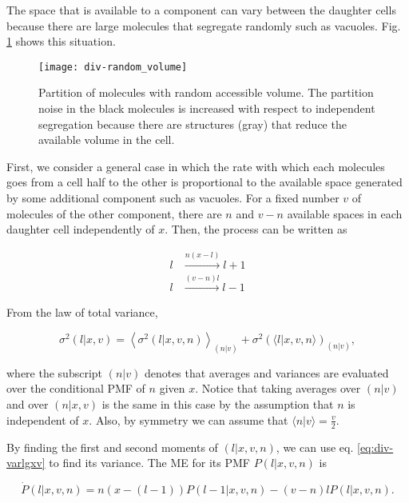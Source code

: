 The space that is available to a component can vary between the daughter cells because there are large molecules that segregate randomly such as vacuoles. Fig. \ref{fig:div-random_volume} shows this situation.

\begin{figure}[H]
  \centering
  \texttt{[image: div-random\_volume]}
  \caption[Partition of molecules with random accessible volume]{\label{fig:div-random_volume}Partition of molecules with random accessible volume. The partition noise in the black molecules is increased with respect to independent segregation because there are structures (gray) that reduce the available volume in the cell.}
\end{figure}

First, we consider a general case in which the rate with which each molecules goes from a cell half to the other is proportional to the available space generated by some additional component such as vacuoles. For a fixed number $v$ of molecules of the other component, there are $n$ and $v-n$ available spaces in each daughter cell independently of $x$. Then, the process can be written as

\begin{equation}
  \label{eq:div-arr_disg}
  \begin{split}
    l&\xrightarrow{n(x-l)}l+1\\
    l&\xrightarrow{(v-n)l}l-1
  \end{split}
\end{equation}

From the law of total variance,

\begin{equation}
  \label{eq:div-varlgxv}
  \sigma^2(l|x,v) = \left\langle\sigma^2(l|x,v,n)\right\rangle_{(n|v)}+\sigma^2\left(\langle l|x,v,n\rangle\right)_{(n|v)},
\end{equation}

where the subscript $(n|v)$ denotes that averages and variances are evaluated over the conditional PMF of $n$ given $x$. Notice that taking averages over $(n|v)$ and over $(n|x,v)$ is the same in this case by the assumption that $n$ is independent of $x$. Also, by symmetry we can assume that $\langle n|v\rangle = \frac{v}{2}$.

By finding the first and second moments of $(l|x,v,n)$, we can use eq. \eqref{eq:div-varlgxv} to find its variance. The ME for its PMF $P(l|x,v,n)$ is

\begin{equation*}
  \dot{P}(l|x,v,n) = n(x-(l-1))P(l-1|x,v,n) - (v-n)lP(l|x,v,n).
\end{equation*}


